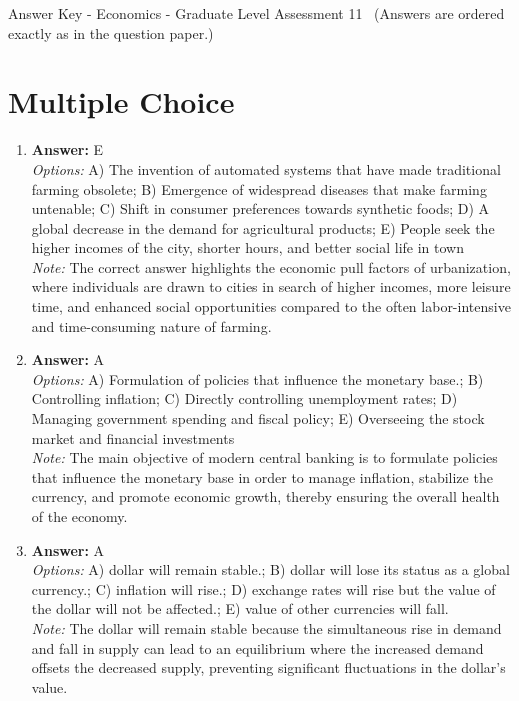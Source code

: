 \documentclass[12pt]{article}
\begin{document}
\begin{center}
Answer Key - Economics - Graduate Level Assessment 11 \
\small (Answers are ordered exactly as in the question paper.)
\end{center}

\section*{Multiple Choice}
\begin{enumerate}[label=\arabic*.]
\item \textbf{Answer:} E
\\ \textit{Options:} A) The invention of automated systems that have made traditional farming obsolete; B) Emergence of widespread diseases that make farming untenable; C) Shift in consumer preferences towards synthetic foods; D) A global decrease in the demand for agricultural products; E) People seek the higher incomes of the city, shorter hours, and better social life in town
\\ \textit{Note:} The correct answer highlights the economic pull factors of urbanization, where individuals are drawn to cities in search of higher incomes, more leisure time, and enhanced social opportunities compared to the often labor-intensive and time-consuming nature of farming.
\item \textbf{Answer:} A
\\ \textit{Options:} A) Formulation of policies that influence the monetary base.; B) Controlling inflation; C) Directly controlling unemployment rates; D) Managing government spending and fiscal policy; E) Overseeing the stock market and financial investments
\\ \textit{Note:} The main objective of modern central banking is to formulate policies that influence the monetary base in order to manage inflation, stabilize the currency, and promote economic growth, thereby ensuring the overall health of the economy.
\item \textbf{Answer:} A
\\ \textit{Options:} A) dollar will remain stable.; B) dollar will lose its status as a global currency.; C) inflation will rise.; D) exchange rates will rise but the value of the dollar will not be affected.; E) value of other currencies will fall.
\\ \textit{Note:} The dollar will remain stable because the simultaneous rise in demand and fall in supply can lead to an equilibrium where the increased demand offsets the decreased supply, preventing significant fluctuations in the dollar's value.

\end{enumerate}
\end{document}
